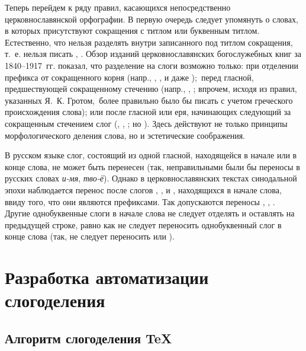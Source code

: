 \documentclass[12pt,a4paper,oneside]{extarticle}
\begin{document}
Теперь перейдем к ряду правил, касающихся непосредственно церковнославянской орфографии. В первую очередь следует упомянуть о словах, в которых присутствуют сокращения с титлом или буквенным титлом. Естественно, что нельзя разделять внутри записанного под титлом сокращения, т.~е. нельзя писать , . Обзор изданий церковнославянских богослужебных книг за 1840--1917~гг. показал, что разделение на слоги возможно только: при отделении префикса от сокращенного корня (напр., , ,  и даже ); перед гласной, предшествующей сокращенному стечению (напр., , ; впрочем, исходя из правил, указанных Я.~К. Гротом, более правильно было бы писать  с учетом греческого происхождения слова); или после гласной или еря, начинающих следующий за сокращенным стечением слог (, , ; но ). Здесь действуют не только принципы морфологического деления слова, но и эстетические соображения.

В русском языке слог, состоящий из одной гласной, находящейся в начале или в конце слова, не может быть перенесен (так, неправильными были бы переносы в русских словах \emph{и-мя}, \emph{тво-ё}). Однако в церковнославянских текстах синодальной эпохи наблюдается перенос после слогов , , и , находящихся в начале слова, ввиду того, что они являются префиксами. Так допускаются переносы , , .  Другие однобуквенные слоги в начале слова не следует отделять и оставлять на предыдущей строке, равно как не следует переносить однобуквенный слог в конце слова (так, не следует переносить  или ).

\section{Разработка автоматизации слогоделения}

\subsection{Алгоритм слогоделения \TeX{}}
\end{document}
